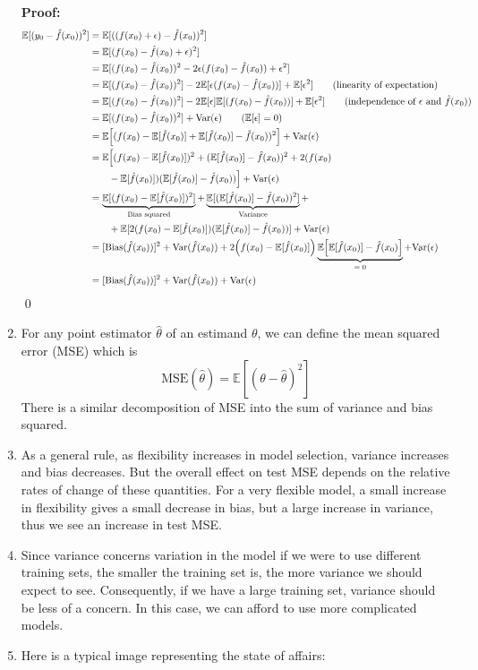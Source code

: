 \documentclass[10pt]{article}
\newcommand{\fhat}{\hat{f}}
\newcommand{\EE}{{\mathbb{E}}}
\newcommand{\Var}{{\rm Var}}
\newcommand{\Bias}{{\rm Bias}}
\newcommand{\eps}{\epsilon}
\renewcommand{\th}{\theta}
\begin{document}
\begin{enumerate}
	\noindent \textbf{Proof:} 
	\begin{align*}
	\EE[ ( y_0 - \fhat(x_0))^2] &= \EE[ ((f(x_0) + \epsilon ) - \fhat(x_0) )^2 ] \\
	&= \EE[ (f(x_0) - \fhat(x_0) + \eps)^2] \\
	&= \EE[ (f(x_0) - \fhat(x_0))^2 - 2\eps(f(x_0) - \fhat(x_0)) + \eps^2 ] \\
	&= \EE[ (f(x_0) - \fhat(x_0))^2 ]  - 2\EE[\eps(f(x_0) - \fhat(x_0)) ]  + \EE[\eps^2 ] \tag{linearity of expectation} \\
	&= \EE[ (f(x_0) - \fhat(x_0))^2 ]  - 2\EE[\eps]\EE[(f(x_0) - \fhat(x_0)) ]  + \EE[\eps^2 ] \tag{independence of $\eps$ and $\fhat(x_0)$} \\
	&= \EE[ (f(x_0) - \fhat(x_0))^2 ]   + \Var(\eps) \tag{$\EE[\eps] = 0$}\\
	&= \EE\Big[ (f(x_0) - \EE[\fhat(x_0)] + \EE[\fhat(x_0)]  - \fhat(x_0))^2 \Big]   + \Var(\eps) \\
	&= \EE\Big[ (f(x_0) - \EE[\fhat(x_0)])^2 + (\EE[\fhat(x_0)]  - \fhat(x_0))^2 + 2(f(x_0) \\ 
	& \qquad  - \EE[\fhat(x_0)])(\EE[\fhat(x_0)]  - \fhat(x_0)) \Big]   + \Var(\eps) \\
	&= \underbrace{\EE[(f(x_0) - \EE[\fhat(x_0)])^2]}_{\text{Bias squared}} + \underbrace{\EE[(\EE[\fhat(x_0)]  - \fhat(x_0))^2]}_{\text{Variance}} + \\
	& \qquad + \EE[2(f(x_0) - \EE[\fhat(x_0)])(\EE[\fhat(x_0)]  - \fhat(x_0))] + \Var(\eps)\\ 
	&= [\Bias(\fhat(x_0))]^2 + \Var(\fhat(x_0)) + 2\Big(f(x_0) - \EE[\fhat(x_0)] \Big) \underbrace{\EE\Big[\EE[\fhat(x_0)]  - \fhat(x_0)\Big]}_\text{$ = 0$} + \Var(\eps) \\
	&= [\Bias(\fhat(x_0))]^2 + \Var(\fhat(x_0)) + \Var(\eps) 	
	\end{align*}
	\qed
\item {\color{brown} For any point estimator $\hat\th$ of an estimand $\th$, we can define the mean squared error (MSE) which is $$\text{MSE}(\hat \th) = \EE[ ( \th - \hat \th)^2]$$ 
There is a similar decomposition of MSE into the sum of variance and bias squared.}
\item As a general rule, as flexibility increases in model selection, variance increases and bias decreases.  But the overall effect on test MSE depends on the relative rates of change of these quantities.  For a very flexible model, a small increase in flexibility gives a small decrease in bias, but a large increase in variance, thus we see an increase in test MSE.
\item {\color{brown} Since variance concerns variation in the model if we were to use different training sets, the smaller the training set is, the more variance we should expect to see.  Consequently, if we have a large training set, variance should be less of a concern.  In this case, we can afford to use more complicated models.}
\item Here is a typical image representing the state of affairs:


\end{enumerate}
\end{document}
